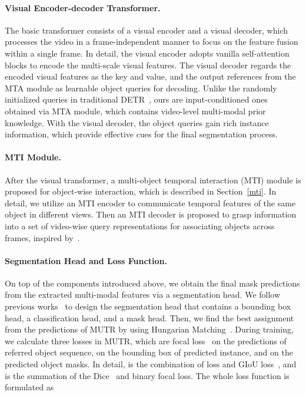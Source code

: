 \documentclass{article}
\begin{document}
\paragraph{Visual Encoder-decoder Transformer.}
The basic transformer consists of a visual encoder and a visual decoder, which processes the video in a frame-independent manner to focus on the feature fusion within a single frame. In detail, the visual encoder adopts vanilla self-attention blocks to encode the multi-scale visual features. 
The visual decoder regards the encoded visual features as the key and value, and the output references from the MTA module as learnable object queries for decoding. 
Unlike the randomly initialized queries in traditional DETR~\cite{carion2020end}, ours are input-conditioned ones obtained via MTA module, which contains video-level multi-modal prior knowledge. With the visual decoder, the object queries gain rich instance information, which provide effective cues for the final segmentation process.


\paragraph{MTI Module.}
After the visual transformer, a multi-object temporal interaction (MTI) module is proposed for object-wise interaction, which is described in Section~\ref{mti}. In detail, we utilize an MTI encoder to communicate temporal features of the same object in different views. Then an MTI decoder is proposed to grasp information into a set of video-wise query representations for associating objects across frames, inspired by~\cite{heo2022vita}. 

\paragraph{Segmentation Head and Loss Function.}
On top of the components introduced above, we obtain the final mask predictions from the extracted multi-modal features via a segmentation head. We follow previous works~\cite{wu2022language,wu2021seqformer} to design the segmentation head that contains a bounding box head, a classification head, and a mask head. Then, we find the best assignment from the predictions of MUTR by using Hungarian Matching~\cite{carion2020end}. During training, we calculate three losses in MUTR, which are focal loss~\cite{lin2017focal}  on the predictions of referred object sequence,  on the bounding box of predicted instance, and  on the predicted object masks. In detail,  is the combination of  loss and GIoU loss~\cite{rezatofighi2019generalized}, and  is the summation of the Dice~\cite{milletari2016v} and binary focal loss. The whole loss function is formulated as
\end{document}
